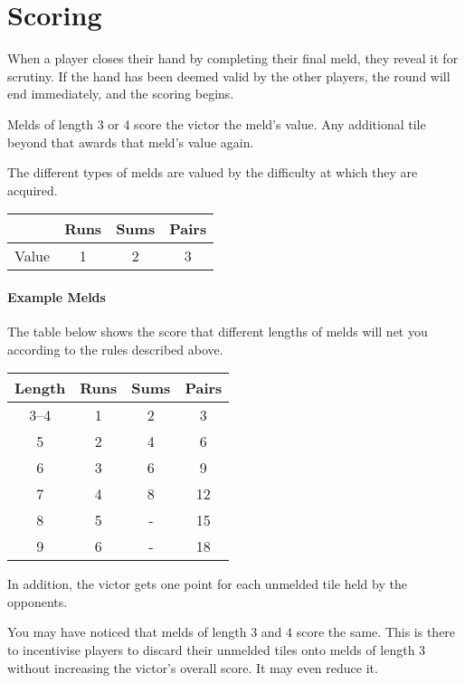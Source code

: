 \section{Scoring}\label{sec:scoring}
When a player closes their hand by completing their final meld, they reveal it for scrutiny. 
If the hand has been deemed valid by the other players, the round will end immediately, and the scoring begins.

Melds of length 3 or 4 score the victor the meld's value. Any additional tile beyond that awards that meld's value again.

The different types of melds are valued by the difficulty at which they are acquired.

\begin{center}
    \begin{tabular}{c||c|c|c}
              & Runs & Sums & Pairs\\\hline\hline
        Value & 1 & 2 & 3\\
    \end{tabular}
\end{center}

\paragraph{Example Melds}
The table below shows the score that different lengths of melds will net you according to the rules described above.
\begin{center}
    \begin{tabular}{c||c|c|c}
        Length & Runs & Sums & Pairs\\\hline\hline
        3--4 & 1 &  2 &  3 \\
           5 & 2 &  4 &  6 \\
           6 & 3 &  6 &  9 \\
           7 & 4 &  8 & 12 \\
           8 & 5 &  - & 15 \\
           9 & 6 &  - & 18 \\
    \end{tabular}
\end{center}
In addition, the victor gets one point for each unmelded tile held by the opponents.

\aside You may have noticed that melds of length 3 and 4 score the same. This is there to incentivise players to discard their unmelded tiles onto melds of length 3 without increasing the victor's overall score. It may even reduce it.


